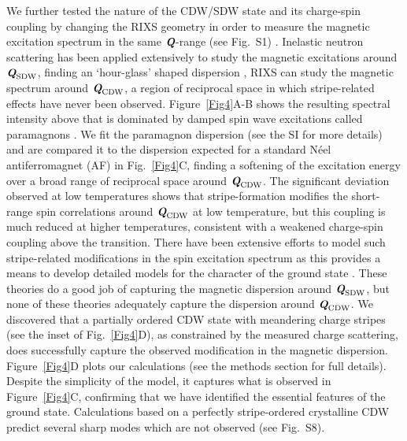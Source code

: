 \documentclass[9pt,twocolumn,twoside]{pnas-new}
\def\mathbi#1{\ensuremath{\textbf{\em #1}}}
\def\QCDW{\ensuremath{\mathbi{Q}_{\text{CDW}}}}
\def\QSDW{\ensuremath{\mathbi{Q}_{\text{SDW}}}}
\begin{document}
We further tested the nature of the CDW/SDW state and its charge-spin coupling by changing the RIXS geometry in order to measure the magnetic excitation spectrum in the same $\mathbi{Q}$-range (see Fig.~S1) \cite{Ament2011}. Inelastic neutron scattering has been applied extensively to study the magnetic excitations around $\mathbi{Q}_\text{SDW}$, finding an `hour-glass' shaped dispersion \cite{Tranquada2004, Seibold2006, Vojta2009}, RIXS can study the magnetic spectrum around $\mathbi{Q}_\text{CDW}$, a region of reciprocal space in which stripe-related effects have never been observed. Figure~\ref{Fig4}A-B shows the resulting spectral intensity above that is dominated by damped spin wave excitations called paramagnons \cite{LeTacon2011,Dean2012, DeanLSCO2013,DeanBSCCO2013}. We fit the paramagnon dispersion (see the SI for more details) and are compared it to the dispersion expected for a standard N\'{e}el antiferromagnet (AF) in Fig.~\ref{Fig4}C, finding a softening of the excitation energy over a broad range of reciprocal space around \QCDW{}. The significant deviation observed at low temperatures shows that stripe-formation modifies the short-range spin correlations around \QCDW{} at low temperature, but this coupling is much reduced at higher temperatures, consistent with a weakened charge-spin coupling above the transition. There have been extensive efforts to model such stripe-related modifications in the spin excitation spectrum as this provides a means to develop detailed models for the character of the ground state \cite{Carlson2004,Seibold2005,Seibold2006,YaoPRB2006,Vojta2009,Lorenzana2002,Seibold2012}. These theories do a good job of capturing the magnetic dispersion around \QSDW{}, but none of these theories adequately capture the dispersion around \QCDW{}. We discovered that a partially ordered CDW state with meandering charge stripes (see the inset of Fig.~\ref{Fig4}D), as constrained by the measured charge scattering, does successfully capture the observed modification in the magnetic dispersion. Figure~\ref{Fig4}D plots our calculations (see the methods section for full details). Despite the simplicity of the model, it captures what is observed in Figure~\ref{Fig4}C, confirming that we have identified the essential features of the ground state. Calculations based on a perfectly stripe-ordered crystalline CDW predict several sharp modes which are not observed (see Fig.~S8). 
\end{document}
